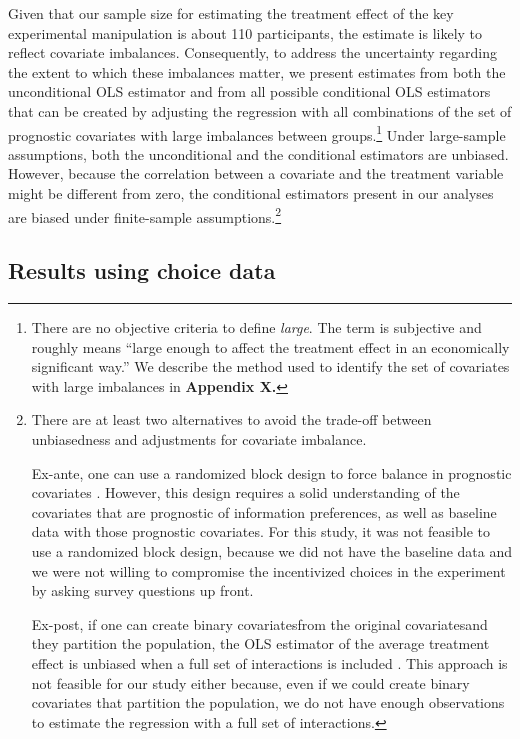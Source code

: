 \documentclass[12pt]{article}
\begin{document}
Given that our sample size for estimating the treatment effect of the key experimental manipulation is about 110 participants, the estimate is likely to reflect covariate imbalances. Consequently, to address the uncertainty regarding the extent to which these imbalances matter, we present estimates from both the unconditional OLS estimator and from all possible conditional OLS estimators that can be created by adjusting the regression with all combinations of the set of prognostic covariates with large imbalances between groups.\footnote{There are no objective criteria to define \emph{large}. The term is subjective and roughly means \enquote{large enough to affect the treatment effect in an economically significant way.} We describe the method used to identify the set of covariates with large imbalances in \textbf{Appendix X.}} Under large-sample assumptions, both the unconditional and the conditional estimators are unbiased. However, because the correlation between a covariate and the treatment variable might be different from zero, the conditional estimators present in our analyses are biased under finite-sample assumptions.\footnote{There are at least two alternatives to avoid the trade-off between unbiasedness and adjustments for covariate imbalance.

Ex-ante, one can use a randomized block design to force balance in prognostic covariates \citet{atheyChapterEconometricsRandomized2017}. However, this design requires a solid understanding of the covariates that are prognostic of information preferences, as well as baseline data with those prognostic covariates. For this study, it was not feasible to use a randomized block design, because we did not have the baseline data and we were not willing to compromise the incentivized choices in the experiment by asking survey questions up front.

Ex-post, if one can create binary covariates\textemdash from the original covariates\textemdash and they partition the population, the OLS estimator of the average treatment effect is unbiased when a full set of interactions is included \citep{linAgnosticNotesRegression2013,atheyChapterEconometricsRandomized2017}. This approach is not feasible for our study either because, even if we could create binary covariates that partition the population, we do not have enough observations to estimate the regression with a full set of interactions.
}

\subsection{Results using choice data}
\end{document}
